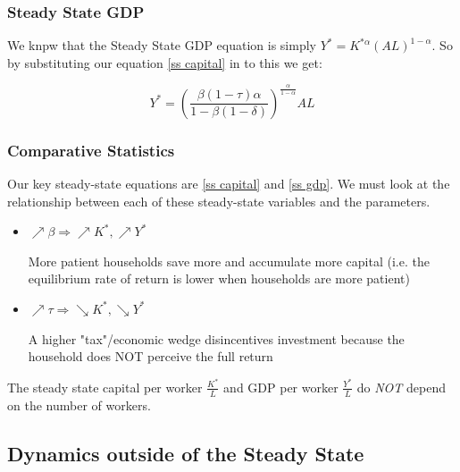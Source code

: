 \documentclass[11pt]{article}
\begin{document}
\subsubsection{Steady State GDP}
We knpw that the Steady State GDP equation is simply $Y^* = K^{*\alpha}(AL)^{1-\alpha}$. So by substituting our equation \eqref{ss capital} in to this we get:

\begin{mdframed}
    \begin{equation}
        \label{ss gdp}
        Y^* =\left(\frac{\beta(1-\tau) \alpha}{1-\beta(1-\delta)}\right)^{\frac{\alpha}{1-\alpha}} A L 
    \end{equation}
\end{mdframed}

\subsubsection{Comparative Statistics}

Our key steady-state equations are \eqref{ss capital} and \eqref{ss gdp}. We must look at the relationship between each of these steady-state variables and the parameters.

\begin{itemize}
    \item $\nearrow \beta \Rightarrow \nearrow K^*, \nearrow Y^*$

    \begin{intu}
        More patient households save more and accumulate more capital (i.e. the equilibrium rate of return is lower when households are more patient)
    \end{intu}
    \item $\nearrow \tau \Rightarrow \searrow K^*, \searrow Y^*$

    \begin{intu}
        A higher "tax"/economic wedge disincentives investment because the household does NOT perceive the full return
    \end{intu}
\end{itemize}

\begin{note}
    The steady state capital per worker $\frac{K^*}{L}$ and GDP per worker $\frac{Y^*}{L}$ do \textit{NOT} depend on the number of workers.
\end{note}

\subsection{Dynamics outside of the Steady State}
\end{document}
